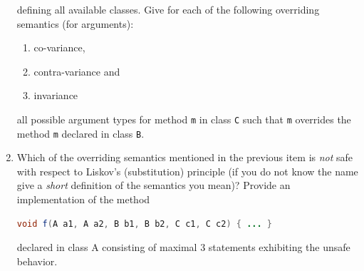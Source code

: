 \documentclass{article}
\newcommand{\comment}[1]{\marginpar{#1}}
\begin{document}
\begin{enumerate}
\begin{center}
\end{center}
defining all available classes. 
Give for each of the following overriding semantics (for arguments):
\begin{enumerate}
  \item co-variance,
  \item contra-variance and
  \item invariance
\end{enumerate}
all possible argument types for method \lstinline!m! in class
\lstinline!C! such that \lstinline!m! overrides the method
\lstinline!m! declared in class \lstinline!B!.  \comment{\textbf{3 points}}
\item Which of the overriding
  semantics mentioned in the previous item is \emph{not} safe with
  respect to Liskov's (substitution) principle (if you do not know the
  name give a \emph{short} definition of the semantics you mean)?
  Provide an implementation of the method
\begin{lstlisting}[language=Java, columns=flexible, basicstyle=\small]
void f(A a1, A a2, B b1, B b2, C c1, C c2) { ... }        
\end{lstlisting}
declared in class A consisting of maximal 3 statements exhibiting the
unsafe behavior. \comment{\textbf{2 points}}


\end{enumerate}
\end{document}
